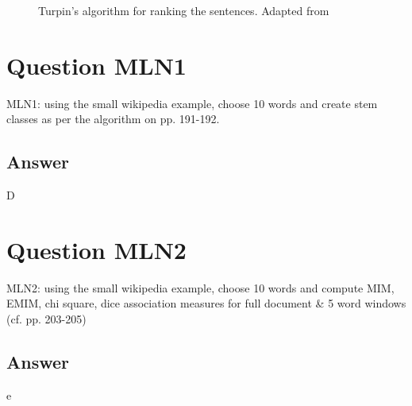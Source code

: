 \documentclass[letterpaper,11pt]{article}
\begin{document}
\begin{figure}[H]
	\centering
	\caption{Turpin's algorithm for ranking the sentences. Adapted from \cite{Turpin:2007:FGR:1277741.1277766}}
	\label{fig:sentence_rank}
\end{figure}

\noindent\makebox[\linewidth]{\rule{\textwidth}{0.4pt}}

\section*{Question MLN1}
\begin{spverbatim}
MLN1: using the small wikipedia example, choose 10 words and create stem classes as per the algorithm on pp. 191-192.
\end{spverbatim}

\subsection*{Answer}
D
    
\noindent\makebox[\linewidth]{\rule{\textwidth}{0.4pt}}


\section*{Question MLN2}
\begin{spverbatim}
MLN2: using the small wikipedia example, choose 10 words and compute MIM, EMIM, chi square, dice association measures for full document & 5 word windows (cf. pp. 203-205)
\end{spverbatim}

\subsection*{Answer}
e

\medskip


\end{document}
